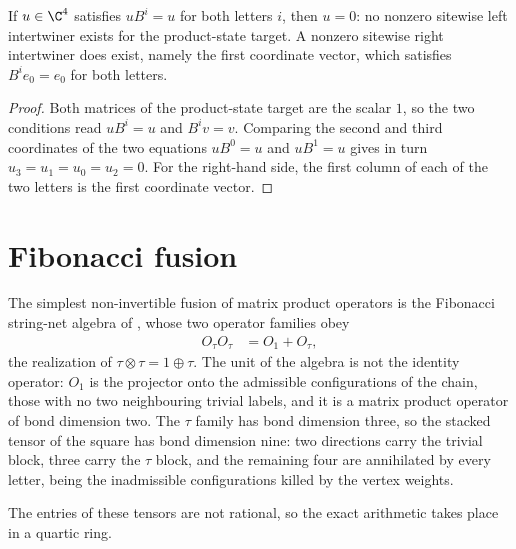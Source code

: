 \begin{theorem}
    \label{thm:asymex_kw_ghz_intertwiner}
    \leanok
    If $u\in\C^4$ satisfies $uB^i=u$ for both letters $i$, then $u=0$: no
    nonzero sitewise left intertwiner exists for the product-state target.
    A nonzero sitewise right intertwiner does exist, namely the first
    coordinate vector, which satisfies $B^ie_0=e_0$ for both letters.
\end{theorem}

\begin{proof}
    \leanok
    Both matrices of the product-state target are the scalar $1$, so the
    two conditions read $uB^i=u$ and $B^iv=v$. Comparing the second and
    third coordinates of the two equations $uB^0=u$ and $uB^1=u$ gives in
    turn $u_3=u_1=u_0=u_2=0$. For the right-hand side, the first column of
    each of the two letters is the first coordinate vector.
\end{proof}

\section{Fibonacci fusion}%
\label{sec:asymex_fibonacci}

The simplest non-invertible fusion of matrix product operators is the
Fibonacci string-net algebra of \cite[Appendix~D.1]{Bultinck2017Anyons},
whose two operator families obey
\begin{align}
    O_\tau O_\tau & =O_1+O_\tau,
    \label{eq:asymex_fib_fusion}
\end{align}
the realization of $\tau\otimes\tau=1\oplus\tau$. The unit of the algebra
is not the identity operator: $O_1$ is the projector onto the admissible
configurations of the chain, those with no two neighbouring trivial labels,
and it is a matrix product operator of bond dimension two. The $\tau$
family has bond dimension three, so the stacked tensor of the square has
bond dimension nine: two directions carry the trivial block, three carry
the $\tau$ block, and the remaining four are annihilated by every letter,
being the inadmissible configurations killed by the vertex weights.

The entries of these tensors are not rational, so the exact arithmetic
takes place in a quartic ring.

